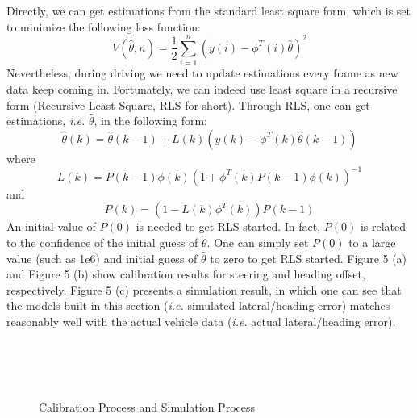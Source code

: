 \documentclass[letterpaper, 10 pt, conference]{ieeeconf}
\begin{document}
Directly, we can get estimations from the standard least square form, which is set to minimize the following loss function:
\begin{equation*}
    V(\hat{\theta}, n) = \frac{1}{2}\sum_{i=1}^{n}(y(i)-\phi^T(i)\hat{\theta})^2
\end{equation*}
Nevertheless, during driving we need to update estimations every frame as new data keep coming in. 
Fortunately, we can indeed use least square in a recursive form (Recursive Least Square, RLS for short). 
Through RLS, one can get estimations, \textit{i.e.} $\hat{\theta}$, in the following form:
\begin{equation}
    \hat{\theta}(k) = \hat{\theta}(k-1) + L(k)(y(k) - \phi^T(k)\hat{\theta}(k-1))
\end{equation}
where 
\begin{equation}
    L(k) = P(k-1)\phi(k)(1+\phi^T(k)P(k-1)\phi(k))^{-1}
\end{equation}
and
\begin{equation}
    P(k) = (1 - L(k)\phi^T(k))P(k-1)
\end{equation}
An initial value of $P(0)$ is needed to get RLS started.
In fact, $P(0)$ is related to the confidence of the initial guess of $\hat{\theta}$.
One can simply set $P(0)$ to a large value (such as 1e6) and initial guess of $\hat{\theta}$ to zero to get RLS started.
Figure 5 (a) and Figure 5 (b) show calibration results for steering and heading offset, respectively.
Figure 5 (c) presents a simulation result, in which one can see that the models built in this section (\textit{i.e.} simulated lateral/heading error) matches reasonably well with the actual vehicle data (\textit{i.e.} actual lateral/heading error).
\begin{figure}[thpb!]
\vspace{-0.cm}
\small
\centering
    \\
      \\
     \\  
  \caption{Calibration Process and Simulation Process}
  \label{fig:calibration}
  \scriptsize{}
\end{figure}

\end{document}
